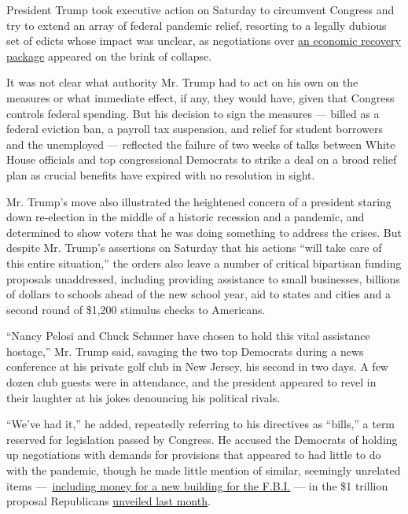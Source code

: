 President Trump took executive action on Saturday to circumvent Congress
and try to extend an array of federal pandemic relief, resorting to a
legally dubious set of edicts whose impact was unclear, as negotiations
over
\href{https://www.nytimes.com/2020/08/08/world/coronavirus-updates.html}{an
economic recovery package} appeared on the brink of collapse.

It was not clear what authority Mr. Trump had to act on his own on the
measures or what immediate effect, if any, they would have, given that
Congress controls federal spending. But his decision to sign the
measures --- billed as a federal eviction ban, a payroll tax suspension,
and relief for student borrowers and the unemployed --- reflected the
failure of two weeks of talks between White House officials and top
congressional Democrats to strike a deal on a broad relief plan as
crucial benefits have expired with no resolution in sight.

Mr. Trump's move also illustrated the heightened concern of a president
staring down re-election in the middle of a historic recession and a
pandemic, and determined to show voters that he was doing something to
address the crises. But despite Mr. Trump's assertions on Saturday that
his actions ``will take care of this entire situation,'' the orders also
leave a number of critical bipartisan funding proposals unaddressed,
including providing assistance to small businesses, billions of dollars
to schools ahead of the new school year, aid to states and cities and a
second round of \$1,200 stimulus checks to Americans.

``Nancy Pelosi and Chuck Schumer have chosen to hold this vital
assistance hostage,'' Mr. Trump said, savaging the two top Democrats
during a news conference at his private golf club in New Jersey, his
second in two days. A few dozen club guests were in attendance, and the
president appeared to revel in their laughter at his jokes denouncing
his political rivals.

``We've had it,'' he added, repeatedly referring to his directives as
``bills,'' a term reserved for legislation passed by Congress. He
accused the Democrats of holding up negotiations with demands for
provisions that appeared to had little to do with the pandemic, though
he made little mention of similar, seemingly unrelated items
---~\href{https://www.nytimes.com/2020/07/28/us/politics/republicans-trump-fbi-building-virus-relief-bill.html}{including
money for a new building for the F.B.I.} --- in the \$1 trillion
proposal Republicans
\href{https://www.nytimes.com/2020/07/27/us/politics/republicans-jobless-aid.html}{unveiled
last month}.

